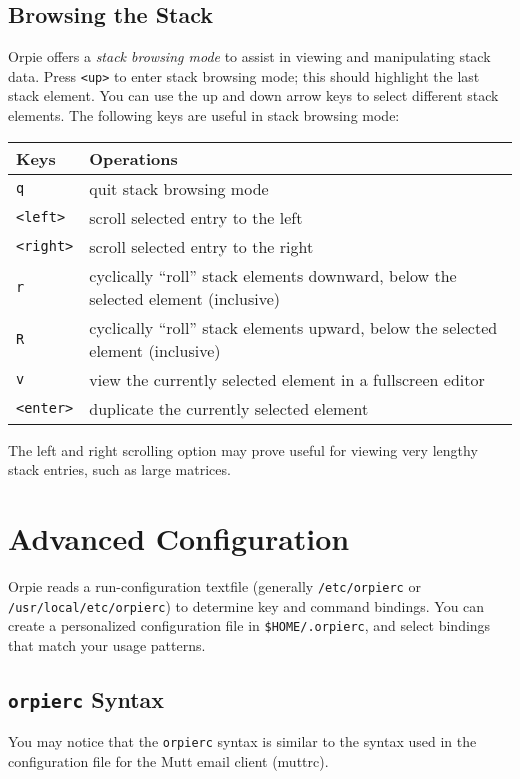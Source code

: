 \documentclass[11pt,notitlepage]{article}
\begin{document}
\subsection{Browsing the Stack}
Orpie offers a {\em stack browsing mode} to assist in viewing and manipulating
stack data.  Press {\tt <up>} to enter stack browsing mode; this should
highlight the last stack element.  You can use the up and down arrow keys to
select different stack elements.  The following keys are useful in stack
browsing mode:
\begin{center}
   \begin{tabular}[t]{|l|l|}
      \hline Keys & Operations \\
      \hline
      {\tt q} & quit stack browsing mode \\
      {\tt <left>} & scroll selected entry to the left \\
      {\tt <right>} & scroll selected entry to the right \\
      {\tt r} & cyclically ``roll'' stack elements downward, below the 
               selected element (inclusive) \\
      {\tt R} & cyclically ``roll'' stack elements upward, below the selected
               element (inclusive) \\
      {\tt v} & view the currently selected element in a fullscreen editor \\
      {\tt <enter>} & duplicate the currently selected element \\
      \hline
   \end{tabular}
\end{center}

The left and right scrolling option may prove useful for viewing very lengthy
stack entries, such as large matrices.

\section{Advanced Configuration}
\label{advanced}
Orpie reads a run-configuration textfile (generally {\tt /etc/orpierc} or
{\tt /usr/local/etc/orpierc}) to determine key and command bindings.  You can
create a personalized configuration file in {\tt \$HOME/.orpierc}, and select
bindings that match your usage patterns.

\subsection{{\tt orpierc} Syntax}
You may notice that the  {\tt orpierc} syntax is similar to the syntax used in
the configuration file for the Mutt email client (muttrc).
\end{document}
